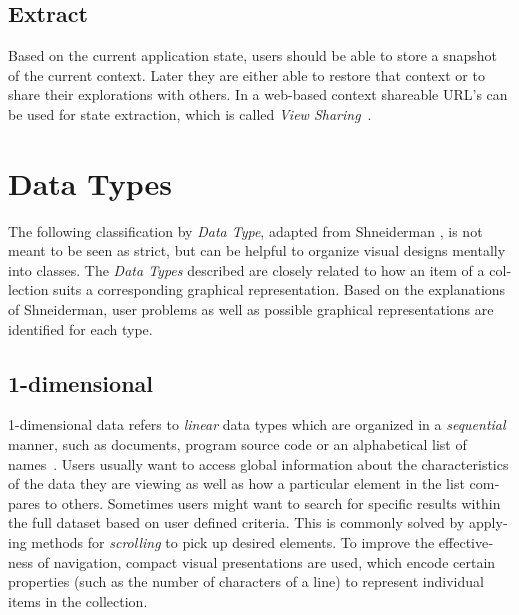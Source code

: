 \begin{english}
\subsection{Extract}

Based on the current application state, users should be able to store a snapshot of the current context. Later they are either able to restore that context or to share their explorations with others. In a web-based context shareable URL's can be used for state extraction, which is called \emph{View Sharing}~\cite{clark91}.


\section{Data Types}

The following classification by \emph{Data Type}, adapted from Shneiderman \cite{shneiderman96eyes}, is not meant to be seen as strict, but can be helpful to organize visual designs mentally into classes. The \emph{Data Types} described are closely related to how an item of a collection suits a corresponding graphical representation. Based on the explanations of Shneiderman, user problems as well as possible graphical representations are identified for each type.


\subsection{1-dimensional}


1-dimensional data refers to \emph{linear} data types which are organized in a \emph{sequential} manner, such as documents, program source code or an alphabetical list of names~\cite{shneiderman96eyes}. Users usually want to access global information about the characteristics of the data they are viewing as well as how a particular element in the list compares to others. Sometimes users might want to search for specific results within the full dataset based on user defined criteria. This is commonly solved by applying methods for \emph{scrolling} to pick up desired elements. To improve the effectiveness of navigation, compact visual presentations are used, which encode certain properties (such as the number of characters of a line) to represent individual items in the collection.



\end{english}
